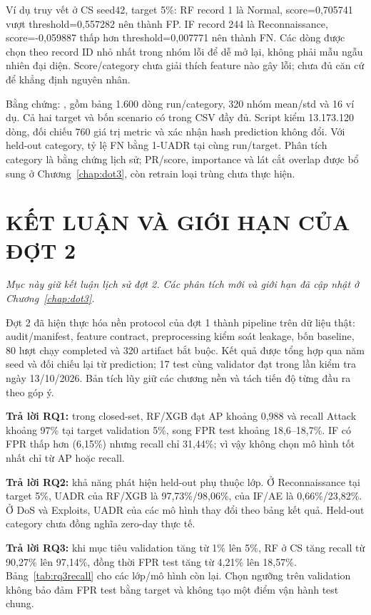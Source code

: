 \documentclass[12pt,a4paper,oneside]{report}
\begin{document}
Ví dụ truy vết ở CS seed42, target 5\%: RF record 1 là Normal, score=0,705741 vượt threshold=0,557282 nên thành FP. IF record 244 là Reconnaissance, score=-0,059887 thấp hơn threshold=0,007771 nên thành FN. Các dòng được chọn theo record ID nhỏ nhất trong nhóm lỗi để dễ mở lại, không phải mẫu ngẫu nhiên đại diện. Score/category chưa giải thích feature nào gây lỗi; chưa đủ căn cứ để khẳng định nguyên nhân.

Bằng chứng: , gồm bảng 1.600 dòng run/category, 320 nhóm mean/std và 16 ví dụ. Cả hai target và bốn scenario có trong CSV đầy đủ. Script  kiểm 13.173.120 dòng, đối chiếu 760 giá trị metric và xác nhận hash prediction không đổi. Với held-out category, tỷ lệ FN bằng 1-UADR tại cùng run/target. Phân tích category là bằng chứng lịch sử; PR/score, importance và lát cắt overlap được bổ sung ở Chương~\ref{chap:dot3}, còn retrain loại trùng chưa thực hiện.

\chapter{KẾT LUẬN VÀ GIỚI HẠN CỦA ĐỢT 2}
\noindent\textit{Mục này giữ kết luận lịch sử đợt 2. Các phân tích mới và giới hạn đã cập nhật ở Chương~\ref{chap:dot3}.}\par
Đợt 2 đã hiện thực hóa nền protocol của đợt 1 thành pipeline trên dữ liệu thật: audit/manifest, feature contract, preprocessing kiểm soát leakage, bốn baseline, 80 lượt chạy completed và 320 artifact bắt buộc. Kết quả được tổng hợp qua năm seed và đối chiếu lại từ prediction; 17 test cùng validator đạt trong lần kiểm tra ngày 13/10/2026. Bản tích lũy giữ các chương nền và tách tiến độ từng đầu ra theo góp ý.

\textbf{Trả lời RQ1:} trong closed-set, RF/XGB đạt AP khoảng 0,988 và recall Attack khoảng 97\% tại target validation 5\%, song FPR test khoảng 18,6--18,7\%. IF có FPR thấp hơn (6,15\%) nhưng recall chỉ 31,44\%; vì vậy không chọn mô hình tốt nhất chỉ từ AP hoặc recall.

\textbf{Trả lời RQ2:} khả năng phát hiện held-out phụ thuộc lớp. Ở Reconnaissance tại target 5\%, UADR của RF/XGB là 97,73\%/98,06\%, của IF/AE là 0,66\%/23,82\%. Ở DoS và Exploits, UADR của các mô hình thay đổi theo bảng kết quả. Held-out category chưa đồng nghĩa zero-day thực tế.

\textbf{Trả lời RQ3:} khi mục tiêu validation tăng từ 1\% lên 5\%, RF ở CS tăng recall từ 90,27\% lên 97,14\%, đồng thời FPR test tăng từ 4,21\% lên 18,57\%. Bảng~\ref{tab:rq3recall} cho các lớp/mô hình còn lại. Chọn ngưỡng trên validation không bảo đảm FPR test bằng target và không tạo một điểm vận hành test chung.
\end{document}
